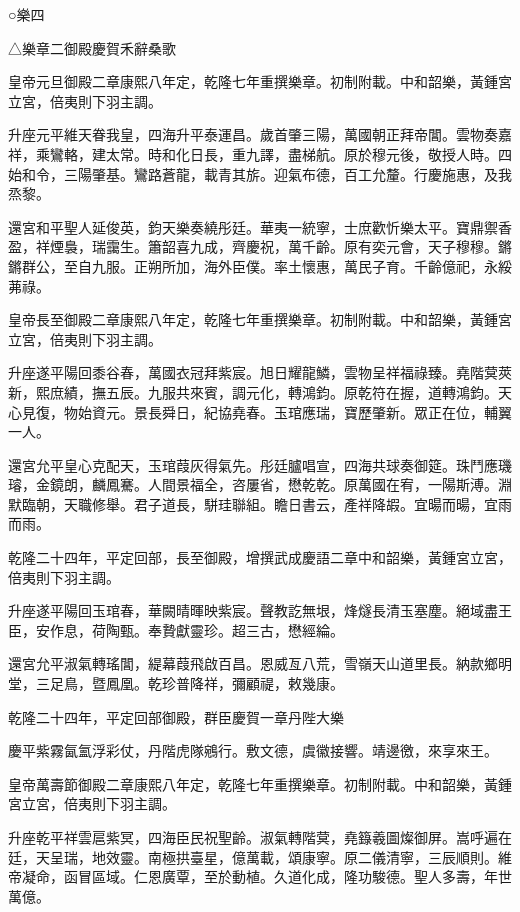 
\begin{pinyinscope}
○樂四

△樂章二御殿慶賀禾辭桑歌

皇帝元旦御殿二章康熙八年定，乾隆七年重撰樂章。初制附載。中和韶樂，黃鍾宮立宮，倍夷則下羽主調。

升座元平維天眷我皇，四海升平泰運昌。歲首肇三陽，萬國朝正拜帝閶。雲物奏嘉祥，乘鸞輅，建太常。時和化日長，重九譯，盡梯航。原於穆元後，敬授人時。四始和令，三陽肇基。鸞路蒼龍，載青其旂。迎氣布德，百工允釐。行慶施惠，及我烝黎。

還宮和平聖人延俊英，鈞天樂奏繞彤廷。華夷一統寧，士庶歡忻樂太平。寶鼎禦香盈，祥煙裊，瑞靄生。簫韶喜九成，齊慶祝，萬千齡。原有奕元會，天子穆穆。鏘鏘群公，至自九服。正朔所加，海外臣僕。率土懷惠，萬民子育。千齡億祀，永綏茀祿。

皇帝長至御殿二章康熙八年定，乾隆七年重撰樂章。初制附載。中和韶樂，黃鍾宮立宮，倍夷則下羽主調。

升座遂平陽回黍谷春，萬國衣冠拜紫宸。旭日耀龍鱗，雲物呈祥福祿臻。堯階蓂莢新，熙庶績，撫五辰。九服共來賓，調元化，轉鴻鈞。原乾符在握，道轉鴻鈞。天心見復，物始資元。景長舜日，紀協堯春。玉琯應瑞，寶歷肇新。眾正在位，輔翼一人。

還宮允平皇心克配天，玉琯葭灰得氣先。彤廷臚唱宣，四海共球奏御筵。珠鬥應璣璿，金鏡朗，麟鳳騫。人間景福全，咨屢省，懋乾乾。原萬國在宥，一陽斯溥。淵默臨朝，天職修舉。君子道長，駢珪聯組。瞻日書云，產祥降嘏。宜暘而暘，宜雨而雨。

乾隆二十四年，平定回部，長至御殿，增撰武成慶語二章中和韶樂，黃鍾宮立宮，倍夷則下羽主調。

升座遂平陽回玉琯春，華闕晴暉映紫宸。聲教訖無垠，烽燧長清玉塞塵。絕域盡王臣，安作息，荷陶甄。奉贄獻靈珍。超三古，懋經綸。

還宮允平淑氣轉瑤閶，緹幕葭飛啟百昌。恩威亙八荒，雪嶺天山道里長。納款鄉明堂，三足鳥，暨鳳凰。乾珍普降祥，彌顧禔，敕幾康。

乾隆二十四年，平定回部御殿，群臣慶賀一章丹陛大樂

慶平紫霧氤氳浮彩仗，丹階虎隊鵷行。敷文德，虞徽接響。靖邊徼，來享來王。

皇帝萬壽節御殿二章康熙八年定，乾隆七年重撰樂章。初制附載。中和韶樂，黃鍾宮立宮，倍夷則下羽主調。

升座乾平祥雲扈紫冥，四海臣民祝聖齡。淑氣轉階蓂，堯籙羲圖燦御屏。嵩呼遍在廷，天呈瑞，地效靈。南極拱臺星，億萬載，頌康寧。原二儀清寧，三辰順則。維帝凝命，函冒區域。仁恩廣覃，至於動植。久道化成，隆功駿德。聖人多壽，年世萬億。


\end{pinyinscope}
